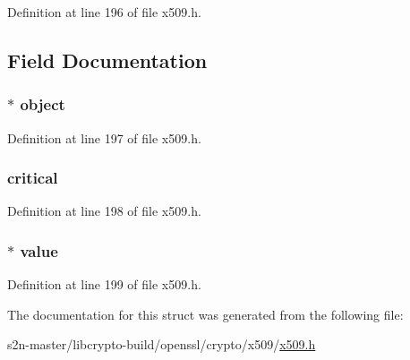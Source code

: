 Definition at line 196 of file x509.\+h.



\subsection{Field Documentation}
\subsubsection[{\texorpdfstring{object}{object}}]{ $\ast$ object}\hypertarget{struct_x509__extension__st_aac268aa1904733da5af63d97def610c4}{}\label{struct_x509__extension__st_aac268aa1904733da5af63d97def610c4}


Definition at line 197 of file x509.\+h.

\subsubsection[{\texorpdfstring{critical}{critical}}]{ critical}\hypertarget{struct_x509__extension__st_a2afa222504cf61c78a0f916f153ebb63}{}\label{struct_x509__extension__st_a2afa222504cf61c78a0f916f153ebb63}


Definition at line 198 of file x509.\+h.

\subsubsection[{\texorpdfstring{value}{value}}]{ $\ast$ value}\hypertarget{struct_x509__extension__st_a3484b8a1534b1edc0debea393f4586a0}{}\label{struct_x509__extension__st_a3484b8a1534b1edc0debea393f4586a0}


Definition at line 199 of file x509.\+h.



The documentation for this struct was generated from the following file\+:\begin{DoxyCompactItemize}
\item 
s2n-\/master/libcrypto-\/build/openssl/crypto/x509/\hyperlink{crypto_2x509_2x509_8h}{x509.\+h}\end{DoxyCompactItemize}

